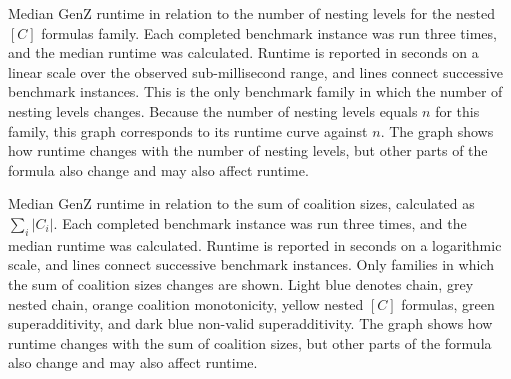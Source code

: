 \caption{Median GenZ runtime in relation to the number of nesting levels for the nested \([C]\) formulas family. Each completed benchmark instance was run three times, and the median runtime was calculated. Runtime is reported in seconds on a linear scale over the observed sub-millisecond range, and lines connect successive benchmark instances. This is the only benchmark family in which the number of nesting levels changes. Because the number of nesting levels equals \(n\) for this family, this graph corresponds to its runtime curve against \(n\). The graph shows how runtime changes with the number of nesting levels, but other parts of the formula also change and may also affect runtime.}
\label{fig:nesting-levels}

\caption{Median GenZ runtime in relation to the sum of coalition sizes, calculated as \(\sum_i |C_i|\). Each completed benchmark instance was run three times, and the median runtime was calculated. Runtime is reported in seconds on a logarithmic scale, and lines connect successive benchmark instances. Only families in which the sum of coalition sizes changes are shown. Light blue denotes chain, grey nested chain, orange coalition monotonicity, yellow nested \([C]\) formulas, green superadditivity, and dark blue non-valid superadditivity. The graph shows how runtime changes with the sum of coalition sizes, but other parts of the formula also change and may also affect runtime.}
\label{fig:sum-coalition-sizes}

